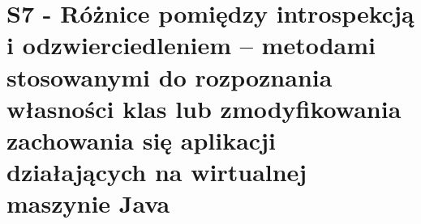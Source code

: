 \section{S7 - Różnice pomiędzy introspekcją i odzwierciedleniem – metodami stosowanymi do rozpoznania własności klas lub zmodyfikowania zachowania się aplikacji działających na wirtualnej maszynie Java}